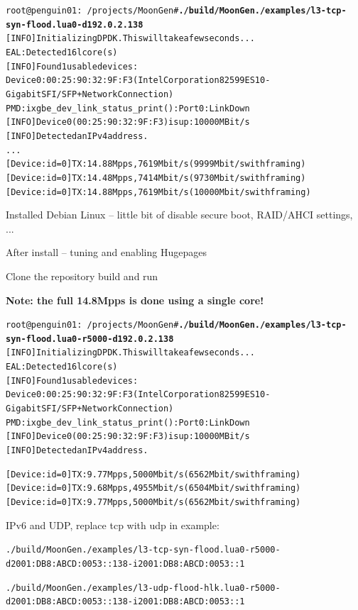 \documentclass[Screen16to9,17pt]{foils}
\begin{document}

\begin{alltt}\footnotesize
root@penguin01:~/projects/MoonGen# {\bfseries ./build/MoonGen ./examples/l3-tcp-syn-flood.lua 0 -d 192.0.2.138}
[INFO]  Initializing DPDK. This will take a few seconds...
EAL: Detected 16 lcore(s)
[INFO]  Found 1 usable devices:
   Device 0: 00:25:90:32:9F:F3 (Intel Corporation 82599ES 10-Gigabit SFI/SFP+ Network Connection)
PMD: ixgbe_dev_link_status_print():  Port 0: Link Down
[INFO]  Device 0 (00:25:90:32:9F:F3) is up: 10000 MBit/s
[INFO]  Detected an IPv4 address.
...
[Device: id=0] TX: 14.88 Mpps, 7619 Mbit/s (9999 Mbit/s with framing)
[Device: id=0] TX: 14.48 Mpps, 7414 Mbit/s (9730 Mbit/s with framing)
[Device: id=0] TX: 14.88 Mpps, 7619 Mbit/s (10000 Mbit/s with framing)
\end{alltt}

\begin{list2}
\item Installed Debian Linux -- little bit of disable secure boot, RAID/AHCI settings, ...
\item After install -- tuning and enabling Hugepages
\item Clone the repository  build and run
\item {\bf Note: the full 14.8Mpps is done using a single core!}
\end{list2}


\begin{alltt}\footnotesize
root@penguin01:~/projects/MoonGen# {\bfseries ./build/MoonGen ./examples/l3-tcp-syn-flood.lua 0 -r 5000 -d 192.0.2.138}
[INFO]  Initializing DPDK. This will take a few seconds...
EAL: Detected 16 lcore(s)
[INFO]  Found 1 usable devices:
   Device 0: 00:25:90:32:9F:F3 (Intel Corporation 82599ES 10-Gigabit SFI/SFP+ Network Connection)
PMD: ixgbe_dev_link_status_print():  Port 0: Link Down
[INFO]  Device 0 (00:25:90:32:9F:F3) is up: 10000 MBit/s
[INFO]  Detected an IPv4 address.

[Device: id=0] TX: 9.77 Mpps, 5000 Mbit/s (6562 Mbit/s with framing)
[Device: id=0] TX: 9.68 Mpps, 4955 Mbit/s (6504 Mbit/s with framing)
[Device: id=0] TX: 9.77 Mpps, 5000 Mbit/s (6562 Mbit/s with framing)
\end{alltt}

IPv6 and UDP, replace tcp with udp in example:
\begin{alltt}\footnotesize
./build/MoonGen ./examples/l3-tcp-syn-flood.lua 0 -r 5000 -d 2001:DB8:ABCD:0053::138 -i 2001:DB8:ABCD:0053::1

./build/MoonGen ./examples/l3-udp-flood-hlk.lua 0 -r 5000 -d 2001:DB8:ABCD:0053::138 -i 2001:DB8:ABCD:0053::1
\end{alltt}
\end{document}
